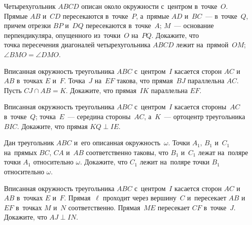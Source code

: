 


\begin{problems}

\item
Четырехугольник $ABCD$ описан около окружности с~центром в~точке~$O$.
Прямые $AB$ и~$CD$ пересекаются в~точке~$P$, а~прямые $AD$ и~$BC$~---
в~точке~$Q$, причем отрезки $BP$ и~$DQ$ пересекаются в~точке~$A$;
$M$~--- основание перпендикуляра, опущенного из~точки~$O$ на~$PQ$.
Докажите, что
\\
\subproblem
точка пересечения диагоналей четырехугольника $ABCD$ лежит на~прямой~$OM$;
\\
\subproblem
$\angle BMO = \angle DMO$.

\item
Вписанная окружность треугольника $ABC$ с~центром~$I$ касается
сторон $AC$ и~$AB$ в~точках $E$ и~$F$.
Точка~$J$ на~$EF$ такова, что прямая~$BJ$ параллельна $AC$.
Пусть $CJ \cap AB = K$.
Докажите, что прямая~$IK$ параллельна $EF$.

\item
Вписанная окружность треугольника $ABC$ с~центром~$I$ касается стороны~$AC$
в~точке~$Q$;
точка~$E$~--- середина стороны~$AC$, а~$K$~--- ортоцентр треугольника $BIC$.
Докажите, что прямая $KQ \perp IE$.

\item
Дан треугольник $ABC$ и~его описанная окружность~$\omega$.
Точки $A_{1}$, $B_{1}$ и~$C_{1}$ на~прямых $BC$, $CA$ и~$AB$ соответственно
таковы, что $B_{1}$ и~$C_{1}$ лежат на~поляре точки $A_{1}$
относительно $\omega$.
Докажите, что $C_{1}$ лежит на~поляре точки $B_{1}$ относительно $\omega$.

\item
Вписанная окружность треугольника $ABC$ с~центром~$I$ касается
сторон $AC$ и~$AB$ в~точках $E$ и~$F$.
Прямая~$\ell$ проходит через вершину~$C$ и~пересекает $AB$ и~$EF$
в~точках $M$ и~$N$ соответственно.
Прямая~$ME$ пересекает $CF$ в~точке~$J$.
Докажите, что $AJ \perp IN$.


\end{problems}
